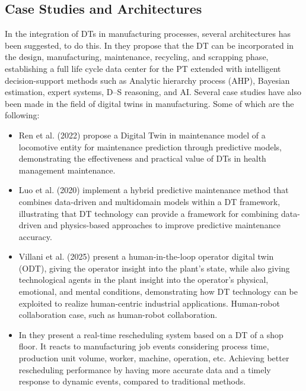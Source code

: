 \subsection{Case Studies and Architectures}
In the integration of DTs in manufacturing processes, several architectures has been suggested, to do this. In\cite{complexEquibment9690056} they propose that the DT can be incorporated in the design, manufacturing, maintenance, recycling, and scrapping phase, establishing a full life cycle data center for the PT extended with intelligent decision-support methods such as Analytic hierarchy process (AHP), Bayesian estimation, expert systems, D–S reasoning, and AI.
Several case studies have also been made in the field of digital twins in manufacturing. Some of which are the following:

\begin{itemize}
    \item Ren et al. (2022) \cite{complexEquibment9690056} propose a Digital Twin in maintenance model of a locomotive entity for maintenance prediction through predictive models, demonstrating the effectiveness and practical value of DTs in health management maintenance.
    \item Luo et al. (2020) \cite{LUO2020101974} implement a hybrid predictive maintenance method that combines data-driven and multidomain models within a DT framework, illustrating that DT technology can provide a framework for combining data-driven and physics-based approaches to improve predictive maintenance accuracy. 
    \item Villani et al. (2025) \cite{human-centric-DT-case-10564577} present a human-in-the-loop operator digital twin (ODT), giving the operator insight into the plant's state, while also giving technological agents in the plant insight into the operator's physical, emotional, and mental conditions, demonstrating how DT technology can be exploited to realize human-centric industrial applications.
    Human-robot collaboration case, such as human-robot collaboration.
    \item In \cite{schedule8821409} they present a real-time rescheduling system based on a DT of a shop floor. It reacts to manufacturing job events considering process time, production unit volume, worker, machine, operation, etc. Achieving better rescheduling performance by having more accurate data and a timely response to dynamic events, compared to traditional methods. 
\end{itemize}

